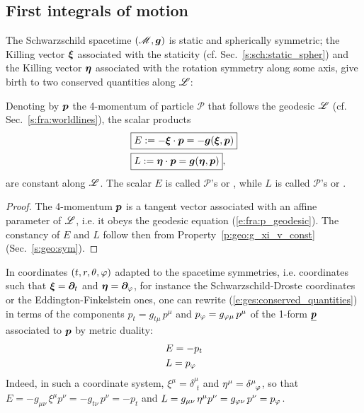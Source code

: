 \subsection{First integrals of motion} \label{s:ges:fiom}

The Schwarzschild spacetime $(\mathscr{M},\bm{g})$ is static and spherically symmetric; the
Killing vector $\bm{\xi}$ associated with the staticity (cf. Sec.~\ref{s:sch:static_spher})
and the Killing vector $\bm{\eta}$ associated with the rotation symmetry along some
axis, give birth to two conserved quantities along $\mathscr{L}$:
\begin{prop}
Denoting by $\bm{p}$ the 4-momentum of particle
$\mathscr{P}$ that follows the geodesic $\mathscr{L}$
(cf. Sec.~\ref{s:fra:worldlines}), the scalar products
\begin{subequations}
\label{e:ges:conserved_quantities}
\begin{align}
& \fbox{$\displaystyle E := - \bm{\xi}\cdot \bm{p} = - \bm{g}(\bm{\xi},\bm{p}) $} \label{e:ges:conserved_energy} \\
& \fbox{$\displaystyle L := \bm{\eta}\cdot \bm{p} = \bm{g}(\bm{\eta},\bm{p}) $} , \label{e:ges:conserved_angu_mom}
\end{align}
\end{subequations}
are constant along $\mathscr{L}$.
The scalar $E$ is called $\mathscr{P}$'s
or ,
while $L$ is called $\mathscr{P}$'s 
or .
\end{prop}
\begin{proof}
The 4-momentum $\bm{p}$ is a tangent vector associated with an affine parameter
of $\mathscr{L}$, i.e. it obeys the geodesic equation (\ref{e:fra:p_geodesic}).
The constancy of $E$ and $L$ follow then from
Property~\ref{p:geo:g_xi_v_const} (Sec.~\ref{s:geo:sym}).
\end{proof}
In coordinates $(t,r,\theta,\varphi)$ adapted to the spacetime symmetries,
i.e. coordinates such that $\bm{\xi} = \bm{\partial}_t$ and $\bm{\eta}=\bm{\partial}_\varphi$,
for instance the Schwarzschild-Droste
coordinates or the Eddington-Finkelstein ones, one can rewrite
(\ref{e:ges:conserved_quantities})
in terms of the components $p_t = g_{t\mu} \, p^\mu$ and $p_\varphi = g_{\varphi\mu} \, p^\mu$
of the 1-form $\underline{\bm{p}}$ associated to $\bm{p}$ by metric duality:
\begin{subequations}
\begin{align}
& E = - p_t \\
& L = p_\varphi
\end{align}
\end{subequations}
Indeed, in such a coordinate system, $\xi^\mu =  \delta^\mu_{\ \, t}$
and $\eta^\mu = \delta^\mu_{\ \, \varphi}$, so that $E = -g_{\mu\nu} \, \xi^\mu p^\nu = -g_{t\nu} \, p^\nu = -p_t$
and $L = g_{\mu\nu} \, \eta^\mu p^\nu = g_{\varphi\nu} \, p^\nu = p_\varphi$.


